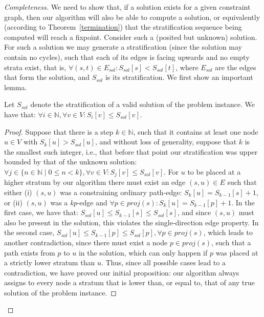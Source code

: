 \begin{proof}[Completeness]
  We need to show that, if a solution exists for a given constraint
  graph, then our algorithm will also be able to compute a solution,
  or equivalently (according to Theorem~\ref{termination}) that the
  stratification sequence being computed will reach a fixpoint.
  Consider such a (posited but unknown) solution. For such a solution
  we may generate a stratification (since the solution may contain no
  cycles), such that each of its edges is facing upwards and no empty
  strata exist, that is, $\forall (s,t) \in E_{sol} : S_{sol}[s] <
  S_{sol}[t]$, where $E_{sol}$ are the edges that form the solution,
  and $S_{sol}$ is its stratification.  We first show an important
  lemma.


  \begin{lem}\label{lemma:minheight}
    Let $S_{sol}$ denote the stratification of a valid solution of the
    problem instance. We have that: $\forall i \in \mathbb{N}, \forall
    v \in V : S_{i}[v] \leq S_{sol}[v]$.
  \end{lem}

  \begin{proof}
    Suppose that there is a step $k \in \mathbb{N}$, such that
    it contains at least one node $u \in V$ with $S_k[u] > S_{sol}[u]$,
    and without loss of generality, suppose that $k$ is the smallest
    such integer, i.e., that before that point our stratification
    was upper bounded by that of the unknown solution:
    $\forall j \in \{n \in \mathbb{N} \;|\; 0 \leq n < k \}, \forall v
    \in V : S_j[v] \leq S_{sol}[v]$. For $u$ to be placed at a higher
    stratum by our algorithm there must exist an edge $(s,u) \in E $
    such that either (i) $(s,u)$ was a constraining ordinary
    path-edge: $S_k[u] = S_{k-1}[s] + 1$, or (ii) $(s,u)$ was a
    \emph{kp}-edge and $\forall p \in \textit{proj}(s) : S_k[u] =
    S_{k-1}[p] + 1$. In the first case, we have that: $S_{sol}[u] \leq
    S_{k-1}[s] \leq S_{sol}[s]$, and since $(s,u)$ must also be
    present in the solution, this violates the single-direction edge
    property. In the second case, $S_{sol}[u] \leq S_{k-1}[p] \leq
    S_{sol}[p], \forall p \in \textit{proj}(s)$, which leads to
    another contradiction, since there must exist a node $p \in
    \textit{proj}(s)$, such that a path exists from $p$ to $u$ in the
    solution, which can only happen if $p$ was placed at a strictly
    lower stratum than $u$. Thus, since all possible cases lead to a
    contradiction, we have proved our initial proposition: our
    algorithm always assigns to every node a stratum that is lower
    than, or equal to, that of any true solution of the problem
    instance.
  \end{proof}


\end{proof}
